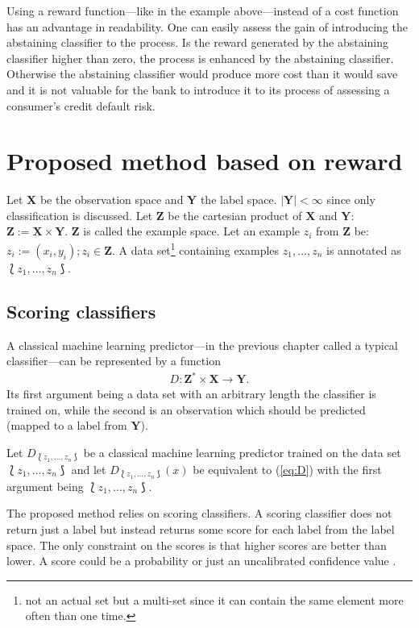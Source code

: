\documentclass[twoside,11pt]{article}
\def\ds{\Lbag z_1,\dots,z_n \Rbag}
\begin{document}
Using a reward function---like in the example
above---instead of a cost function has an advantage in
readability. One can easily assess the gain of introducing
the abstaining classifier to the process.
Is the reward generated by the abstaining classifier higher
than zero, the process is enhanced by the abstaining
classifier.
Otherwise the abstaining classifier would produce more
cost than it would save and it is not valuable for the
bank to introduce it to its process of assessing a
consumer's credit default risk.

\section{Proposed method based on reward}
\label{sec:method}

Let $\textbf{X}$ be the observation space and $\textbf{Y}$
the label space. $|\textbf{Y}| < \infty$ since only
classification is discussed. Let $\textbf{Z}$ be the
cartesian product of $\textbf{X}$ and $\textbf{Y}$:
$\textbf{Z} := \textbf{X} \times \textbf{Y}$.
$\textbf{Z}$ is called the example space.
Let an example $z_i$ from $\textbf{Z}$ be:
$z_i := (x_i, y_i); z_i \in \textbf{Z}$.
A data set\footnote{not an actual set but a multi-set since
it can contain the same element more often than one time.}
containing examples $z_1,\dots,z_n$ is annotated as
$\ds$.

\subsection{Scoring classifiers}

A classical machine learning predictor---in the previous
chapter called a typical classifier---can be represented
by a function
\begin{align}
  \label{eq:D}
  D: \textbf{Z}^* \times \textbf{X} \rightarrow \textbf{Y}.
\end{align}
Its first argument being a data set with an arbitrary
length the classifier is trained on, while the second is an
observation which should be predicted
(mapped to a label from $\textbf{Y}$).

Let $D_{\ds}$ be a classical machine
learning predictor trained on the data set $\ds$ and
let $D_{\ds}(x)$ be equivalent to (\ref{eq:D}) with the
first argument being $\ds$.

The proposed method relies on scoring classifiers.
A scoring classifier does not return just
a label but instead returns some score for each label from
the label space.
The only constraint on the scores is that higher scores
are better than lower.
A score could be a probability or just an uncalibrated
confidence value \citep[see][]{vanderlooy_et_al_2009}.
\end{document}
